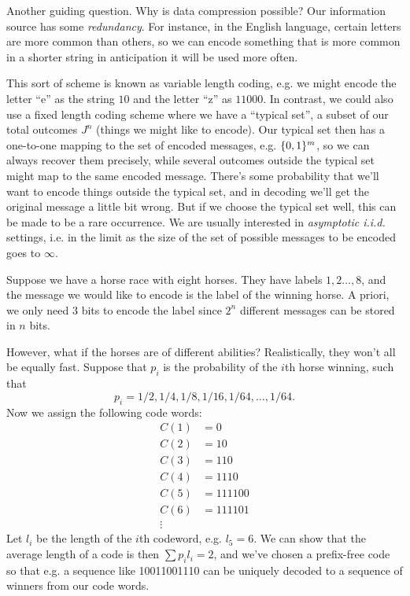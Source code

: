 Another guiding question. Why is data compression possible? Our information source has some \emph{redundancy}. For instance, in the English language, certain letters are more common than others, so we can encode something that is more common in a shorter string in anticipation it will be used more often.

This sort of scheme is known as variable length coding, e.g. we might encode the letter ``e'' as the string $10$ and the letter ``z'' as $11000$. In contrast, we could also use a fixed length coding scheme where we have a ``typical set'', a subset of our total outcomes $J^n$ (things we might like to encode). Our typical set then has a one-to-one mapping to the set of encoded messages, e.g. $\{0,1\}^m$, so we can always recover them precisely, while several outcomes outside the typical set might map to the same encoded message. There's some probability that we'll want to encode things outside the typical set, and in decoding we'll get the original message a little bit wrong. But if we choose the typical set well, this can be made to be a rare occurrence. We are usually interested in \emph{asymptotic i.i.d.} settings, i.e. in the limit as the size of the set of possible messages to be encoded goes to $\infty$.

\begin{exm}
    Suppose we have a horse race with eight horses. They have labels $1,2\ldots, 8$, and the message we would like to encode is the label of the winning horse. A priori, we only need $3$ bits to encode the label since $2^n$ different messages can be stored in $n$ bits.
    
    However, what if the horses are of different abilities? Realistically, they won't all be equally fast. Suppose that $p_i$ is the probability of the $i$th horse winning, such that
    \begin{equation*}
        p_i=1/2,1/4,1/8,1/16,1/64,\ldots,1/64.
    \end{equation*}
    Now we assign the following code words:
    \begin{align*}
        C(1)&=0\\
        C(2)&=10\\
        C(3)&=110\\
        C(4)&=1110\\
        C(5)&=111100\\
        C(6)&=111101\\
        \vdots&
    \end{align*}
    Let $l_i$ be the length of the $i$th codeword, e.g. $l_5=6$. We can show that the average length of a code is then $\sum p_i l_i = 2$, and we've chosen a prefix-free code so that e.g. a sequence like 10011001110 can be uniquely decoded to a sequence of winners from our code words.
\end{exm}